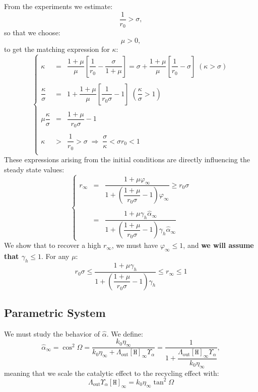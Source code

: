\documentclass[aps,onecolumn,11pt]{revtex4}
\newcommand{\mychem}[1]{\mathtt{#1}}
\newcommand{\myconc}[1]{\left\lbrack{#1}\right\rbrack}
\newcommand{\spproton}{\mychem{H}}
\newcommand{\proton}{\myconc{\spproton}}
\newcommand{\LiAll}{\Lambda}
\newcommand{\LiAllOut}{{\LiAll}_{\mathrm{out}}}
\begin{document}
From the experiments we estimate:
\begin{equation}
\dfrac{1}{r_0}  >  \sigma,
\end{equation}
so that we choose:
\begin{equation}
\mu > 0,
\end{equation}
to get the matching expression for $\kappa$:
\begin{equation}
\left\lbrace
\begin{array}{rcl}
	\kappa  & = &  \dfrac{1+\mu}{\mu}\left[\dfrac{1}{r_0} - \dfrac{\sigma}{1+\mu}\right] 
	=  \sigma + {\dfrac{1+\mu}{\mu}\left[ \dfrac{1}{r_0} - \sigma \right]} \; (\kappa>\sigma)\\
	\\
	\dfrac{\kappa}{\sigma} & = & 1 + {\dfrac{1+\mu}{\mu}\left[ \dfrac{1}{r_0\sigma} - 1\right]} \; \left(\dfrac{\kappa}{\sigma}> 1\right)\\
	\\
	\mu \dfrac{\kappa}{\sigma} & = & \dfrac{1+\mu}{r_0\sigma} - 1\\
	\\
 \kappa & > & \dfrac{1}{r_0} > \sigma \;\Rightarrow\; \dfrac{\sigma}{\kappa} < \sigma r_0  < 1\\
\end{array}
\right.
\end{equation}
These expressions arising from the initial conditions are directly influencing the steady state values:
\begin{equation}
\label{eq:r_ss}
\left\lbrace
\begin{array}{rcl}
	r_\infty & = & \dfrac{1+\mu \varphi_\infty}{1+\left(\dfrac{1+\mu}{r_0\sigma} - 1\right)\varphi_\infty} \geq r_0 \sigma\\
	\\
	& = & \dfrac{1+\mu \gamma_h \hat\alpha_\infty}{1+\left(\dfrac{1+\mu}{r_0\sigma} - 1\right)\gamma_h \hat\alpha_\infty} 
\end{array}
\right.
\end{equation}
We show that to recover a high $r_\infty$, we must have $\varphi_\infty\leq 1$, and \textbf{we will assume that $\gamma_h\leq1$}.
For any $\mu$:
\begin{equation}
	r_0\sigma \leq \dfrac{1+\mu\gamma_h}{1+\left(\dfrac{1+\mu}{r_0\sigma}-1\right) \gamma_h} \leq r_\infty \leq 1
\end{equation}


\subsection{Parametric System}
We must study the behavior of $\hat\alpha$.
We define:
\begin{equation}
	\hat\alpha_\infty = \cos^2\Omega = \dfrac{k_0\eta_\infty}{k_0\eta_\infty+\LiAllOut \proton_\infty \Upsilon_\alpha}
	= \dfrac{1}{1+\dfrac{\LiAllOut \proton_\infty \Upsilon_\alpha}{k_0\eta_\infty}},
\end{equation}
meaning that we scale the catalytic effect to the recycling effect with:
\begin{equation}
	\LiAllOut \Upsilon_\alpha \proton_\infty = {k_0\eta_\infty} \tan^2\Omega
\end{equation}
\end{document}
